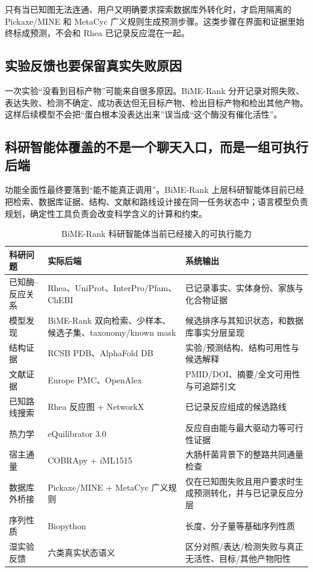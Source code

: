 \documentclass[11pt,a4paper]{ctexart}
\begin{document}
只有当已知图无法连通、用户又明确要求探索数据库外转化时，才启用隔离的 Pickaxe/MINE 和 MetaCyc 广义规则生成预测步骤\cite{pickaxe2023,mine2022,metacyc2018}。这类步骤在界面和证据里始终标成预测，不会和 Rhea 已记录反应混在一起。

\subsection{实验反馈也要保留真实失败原因}

一次实验“没看到目标产物”可能来自很多原因。BiME-Rank 分开记录对照失败、表达失败、检测不确定、成功表达但无目标产物、检出目标产物和检出其他产物。这样后续模型不会把“蛋白根本没表达出来”误当成“这个酶没有催化活性”。


\subsection{科研智能体覆盖的不是一个聊天入口，而是一组可执行后端}

功能全面性最终要落到“能不能真正调用”。BiME-Rank 上层科研智能体目前已经把检索、数据库证据、结构、文献和路线设计接在同一任务状态中；语言模型负责规划，确定性工具负责会改变科学含义的计算和约束。

\begin{table}[htbp]
\centering
\small
\caption{BiME-Rank 科研智能体当前已经接入的可执行能力}
\begin{tabularx}{\textwidth}{@{}L{31mm}L{52mm}Y@{}}
\toprule
\textbf{科研问题} & \textbf{实际后端} & \textbf{系统输出}\\
\midrule
已知酶--反应关系 & Rhea、UniProt、InterPro/Pfam、ChEBI & 已记录事实、实体身份、家族与化合物证据\\
模型发现 & BiME-Rank 双向检索、少样本、候选子集、taxonomy/known mask & 候选排序与其知识状态，和数据库事实分层呈现\\
结构证据 & RCSB PDB、AlphaFold DB & 实验/预测结构、结构可用性与候选解释\\
文献证据 & Europe PMC、OpenAlex & PMID/DOI、摘要/全文可用性与可追踪引文\\
已知路线搜索 & Rhea 反应图 + NetworkX & 已记录反应组成的候选路线\\
热力学 & eQuilibrator 3.0 & 反应自由能与最大驱动力等可行性证据\\
宿主通量 & COBRApy + iML1515 & 大肠杆菌背景下的整路共同通量检查\\
数据库外桥接 & Pickaxe/MINE + MetaCyc 广义规则 & 仅在已知图失败且用户要求时生成预测转化，并与已记录反应分层\\
序列性质 & Biopython & 长度、分子量等基础序列性质\\
湿实验反馈 & 六类真实状态语义 & 区分对照/表达/检测失败与真正无活性、目标/其他产物阳性\\
\bottomrule
\end{tabularx}
\end{table}
\end{document}
